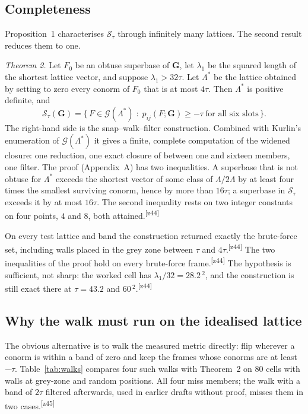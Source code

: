 \documentclass[preprint,pdf]{iucr}          %
\newcommand{\Ang}{\text{\AA}}
\newcommand{\Gmet}{\mathbf{G}}
\newcommand{\Sw}{\mathcal{S}_\tau}
\newcommand{\Cl}{\mathcal{G}}
\newcommand{\chk}[1]{\textsuperscript{[#1]}}
\begin{document}
\subsection{Completeness}
\label{sec:complete}
Proposition~1 characterises $\Sw$ through infinitely many lattices. The second result reduces them to one.

\emph{Theorem 2.} Let $F_0$ be an obtuse superbase of $\Gmet$, let $\lambda_1$ be the squared length of the shortest lattice vector, and suppose $\lambda_1>32\tau$. Let $\Lambda^*$ be the lattice obtained by setting to zero every conorm of $F_0$ that is at most $4\tau$. Then $\Lambda^*$ is positive definite, and
\begin{equation}
\Sw(\Gmet)=\bigl\{\,F\in\Cl(\Lambda^*)\;:\;p_{ij}(F;\Gmet)\ge-\tau\ \text{for all six slots}\,\bigr\}.
\label{eq:theorem}
\end{equation}
The right-hand side is the snap--walk--filter construction. Combined with Kurlin's enumeration of $\Cl(\Lambda^*)$ it gives a finite, complete computation of the widened closure: one reduction, one exact closure of between one and sixteen members, one filter. The proof (Appendix~A) has two inequalities. A superbase that is not obtuse for $\Lambda^*$ exceeds the shortest vector of some class of $\Lambda/2\Lambda$ by at least four times the smallest surviving conorm, hence by more than $16\tau$; a superbase in $\Sw$ exceeds it by at most $16\tau$. The second inequality rests on two integer constants on four points, $4$ and $8$, both attained.\chk{z44}

On every test lattice and band the construction returned exactly the brute-force set, including walls placed in the grey zone between $\tau$ and $4\tau$.\chk{z44} The two inequalities of the proof hold on every brute-force frame.\chk{z44} The hypothesis is sufficient, not sharp: the worked cell has $\lambda_1/32=28.2$\,\Ang$^2$, and the construction is still exact there at $\tau=43.2$ and $60$\,\Ang$^2$.\chk{z44}

\subsection{Why the walk must run on the idealised lattice}
\label{sec:walks}
The obvious alternative is to walk the measured metric directly: flip wherever a conorm is within a band of zero and keep the frames whose conorms are at least $-\tau$. Table~\ref{tab:walks} compares four such walks with Theorem~2 on 80 cells with walls at grey-zone and random positions. All four miss members; the walk with a band of $2\tau$ filtered afterwards, used in earlier drafts without proof, misses them in two cases.\chk{z45}
\end{document}
